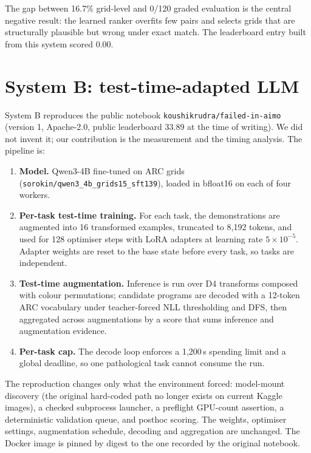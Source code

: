 \documentclass[11pt,a4paper]{article}
\begin{document}
The gap between 16.7\% grid-level and 0/120 graded evaluation is the central negative result: the learned ranker overfits few pairs and selects grids that are structurally plausible but wrong under exact match. The leaderboard entry built from this system scored 0.00.

\section{System B: test-time-adapted LLM}
\label{sec:systemB}

System B reproduces the public notebook \texttt{koushikrudra/failed-in-aimo} (version 1, Apache-2.0, public leaderboard 33.89 at the time of writing). We did not invent it; our contribution is the measurement and the timing analysis. The pipeline is:

\begin{enumerate}
\item \textbf{Model.} Qwen3-4B fine-tuned on ARC grids (\texttt{sorokin/qwen3\_4b\_grids15\_sft139}), loaded in bfloat16 on each of four workers.
\item \textbf{Per-task test-time training.} For each task, the demonstrations are augmented into 16 transformed examples, truncated to 8{,}192 tokens, and used for 128 optimiser steps with LoRA adapters at learning rate $5\times10^{-5}$. Adapter weights are reset to the base state before every task, so tasks are independent.
\item \textbf{Test-time augmentation.} Inference is run over D4 transforms composed with colour permutations; candidate programs are decoded with a 12-token ARC vocabulary under teacher-forced NLL thresholding and DFS, then aggregated across augmentations by a score that sums inference and augmentation evidence.
\item \textbf{Per-task cap.} The decode loop enforces a 1{,}200\,s spending limit and a global deadline, so one pathological task cannot consume the run.
\end{enumerate}

The reproduction changes only what the environment forced: model-mount discovery (the original hard-coded path no longer exists on current Kaggle images), a checked subprocess launcher, a preflight GPU-count assertion, a deterministic validation queue, and posthoc scoring. The weights, optimiser settings, augmentation schedule, decoding and aggregation are unchanged. The Docker image is pinned by digest to the one recorded by the original notebook.
\end{document}
